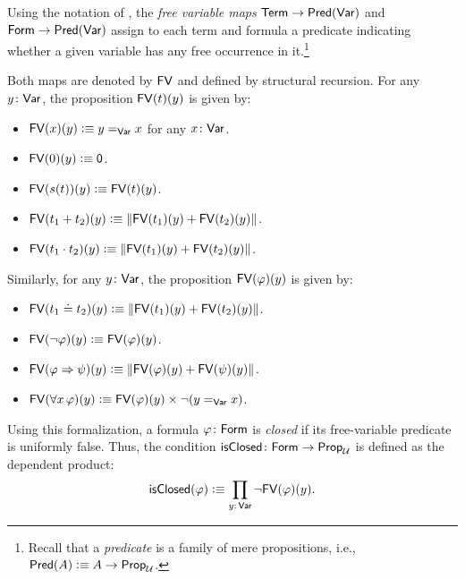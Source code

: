 \begin{defn}\label{defn:FV}
    Using the notation of \citep{caniglia2025hott}, the \textsl{free variable maps} $\mathsf{Term}\to\mathsf{Pred}(\mathsf{Var})$ and $\mathsf{Form}\to\mathsf{Pred}(\mathsf{Var})$ assign to each term and formula a predicate indicating whether a given variable has any free occurrence in it.\footnote{Recall that a \textsl{predicate} is a family of mere propositions, i.e., $\mathsf{Pred}(A)\mathrel{\vcentcolon}\equiv A\to\mathsf{Prop}_\mathcal U$.} 

    Both maps are denoted by $\mathsf{FV}$ and defined by structural recursion. For any $y\colon\fun{Var}$, the proposition $\mathsf{FV}(t)(y)$ is given by:
    \begin{itemize}
        \item $\mathsf{FV}(x)(y) \mathrel{\vcentcolon}\equiv y\mathrel{=_{\mathsf{Var}}}x$ for any $x\colon\fun{Var}$.
        \item $\mathsf{FV}(0)(y)\mathrel{\vcentcolon}\equiv\mathsf{0}$.
        \item $\mathsf{FV}(s(t))(y)\mathrel{\vcentcolon}\equiv\mathsf{FV}(t)(y)$.
        \item $\mathsf{FV}(t_1+t_2)(y)\mathrel{\vcentcolon}\equiv\lVert\mathsf{FV}(t_1)(y)+\mathsf{FV}(t_2)(y)\rVert$.
        \item $\mathsf{FV}(t_1\cdot t_2)(y)\mathrel{\vcentcolon}\equiv\lVert\mathsf{FV}(t_1)(y)+\mathsf{FV}(t_2)(y)\rVert$.
    \end{itemize}
    Similarly, for any $y\colon\fun{Var}$, the proposition $\mathsf{FV}(\varphi)(y)$ is given by:
    \begin{itemize}
        \item $\mathsf{FV}(t_1\doteq t_2)(y)\mathrel{\vcentcolon}\equiv\lVert\mathsf{FV}(t_1)(y)+\mathsf{FV}(t_2)(y)\rVert$.
        \item $\mathsf{FV}(\neg\varphi)(y)\mathrel{\vcentcolon}\equiv\mathsf{FV}(\varphi)(y)$.
        \item $\mathsf{FV}(\varphi\mathrel{\Rightarrow}\psi)(y)\mathrel{\vcentcolon}\equiv\lVert\mathsf{FV}(\varphi)(y)+\mathsf{FV}(\psi)(y)\rVert$.
        \item $\mathsf{FV}(\forall x\,\varphi)(y)\mathrel{\vcentcolon}\equiv\mathsf{FV}(\varphi)(y)\times\neg(y\mathrel{=_{\mathsf{Var}}}x)$.
    \end{itemize}
    Using this formalization, a formula $\varphi\colon\fun{Form}$ is \textsl{closed} if its free-variable predicate is uniformly false. Thus, the condition $\fun{isClosed}\colon\fun{Form}\to\fun{Prop}_\univ$ is defined as the dependent product:
    \[
        \fun{isClosed}(\varphi)\defeq
            \prod_{y\colon\fun{Var}}
                \neg\fun{FV}(\varphi)(y).
    \]
\end{defn}

